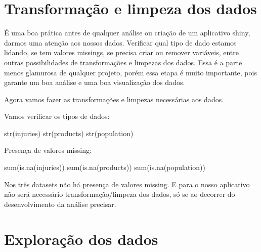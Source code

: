 \documentclass[
]{book}
\newenvironment{Shaded}{\begin{snugshade}}{\end{snugshade}}
\newcommand{\FunctionTok}[1]{\textcolor[rgb]{0.00,0.00,0.00}{#1}}
\newcommand{\NormalTok}[1]{#1}
\begin{document}
\hypertarget{transformauxe7uxe3o-e-limpeza-dos-dados}{%
\section{\texorpdfstring{\textbf{Transformação e limpeza dos dados}}{Transformação e limpeza dos dados}}\label{transformauxe7uxe3o-e-limpeza-dos-dados}}

É uma boa prática antes de qualquer análise ou criação de um aplicativo shiny, darmos uma atenção aos nossos dados. Verificar qual tipo de dado estamos lidando, se tem valores missings, se precisa criar ou remover variáveis, entre outras possibilidades de transformações e limpezas dos dados. Essa é a parte menos glamurosa de qualquer projeto, porém essa etapa é muito importante, pois garante um boa análise e uma boa visualização dos dados.

Agora vamos fazer as transformações e limpezas necessárias aos dados.

Vamos verificar os tipos de dados:

\begin{Shaded}
\begin{Highlighting}[]
\FunctionTok{str}\NormalTok{(injuries) }
\FunctionTok{str}\NormalTok{(products)}
\FunctionTok{str}\NormalTok{(population)}
\end{Highlighting}
\end{Shaded}

Presença de valores missing:

\begin{Shaded}
\begin{Highlighting}[]
\FunctionTok{sum}\NormalTok{(}\FunctionTok{is.na}\NormalTok{(injuries))}
\FunctionTok{sum}\NormalTok{(}\FunctionTok{is.na}\NormalTok{(products))}
\FunctionTok{sum}\NormalTok{(}\FunctionTok{is.na}\NormalTok{(population))}
\end{Highlighting}
\end{Shaded}

Nos três datasets não há presença de valores missing. E para o nosso aplicativo não será necessário transformação/limpeza dos dados, só se ao decorrer do desenvolvimento da análise precisar.

\hypertarget{explorauxe7uxe3o-dos-dados}{%
\section{\texorpdfstring{\textbf{Exploração dos dados}}{Exploração dos dados}}\label{explorauxe7uxe3o-dos-dados}}
\end{document}
